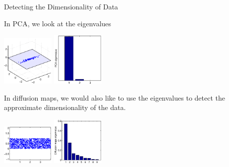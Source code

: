 \documentclass[12pt]{beamer}
\begin{document}
\begin{frame}{Detecting the Dimensionality of Data}

\centering
In PCA, we look at the eigenvalues

\includegraphics[width=1in]{PCA_data}
\includegraphics[width=1in]{PCA_evals}

\vfill 

In diffusion maps, we would also like to use the eigenvalues to detect the approximate dimensionality of the data. 

\includegraphics[width=1in]{strip_data_nocolor}
\includegraphics[width=1in]{strip_evals_nocolor}


\end{frame}
\end{document}
